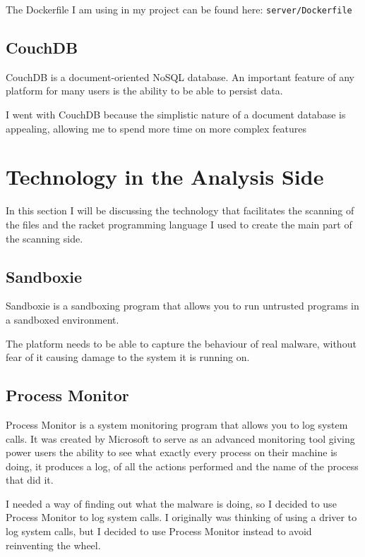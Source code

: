 The Dockerfile I am using in my project can be found here: \texttt{server/Dockerfile}

\subsection{CouchDB}
CouchDB is a document-oriented NoSQL database.
An important feature of any platform for many users is the
ability to be able to persist data.

I went with CouchDB because the simplistic nature of a document database is appealing,
allowing me to spend more time on more complex features


\section{Technology in the Analysis Side}
In this section I will be discussing the technology that facilitates the scanning of the files and the racket programming language I used to create the main part of the scanning side.

\subsection{Sandboxie}
Sandboxie is a sandboxing program that allows you to run untrusted programs in a sandboxed environment.

The platform needs to be able to capture the behaviour of real malware,
without fear of it causing damage to the system it is running on.


\subsection{Process Monitor}
Process Monitor is a system monitoring program that allows you to log system calls.
It was created by Microsoft to serve as an advanced monitoring tool giving power users
the ability to see what exactly every process on their machine is doing,
it produces a log, of all the actions performed and the name of the process that did it.


I needed a way of finding out what the malware is doing, so I decided to use Process Monitor to log system calls.
I originally was thinking of using a driver to log system calls, but I decided to use Process Monitor instead to avoid reinventing the wheel.


